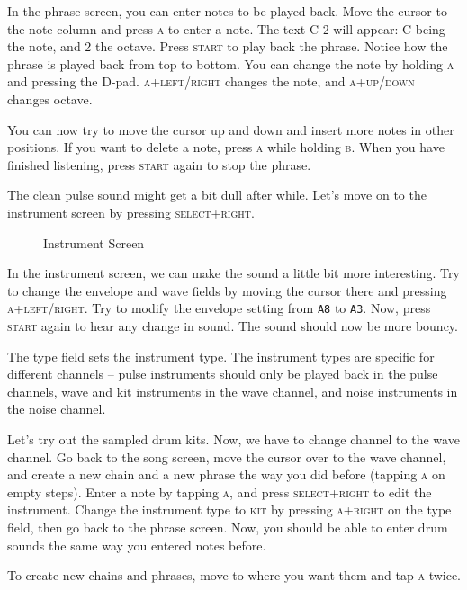 In the phrase screen, you can enter notes to be played back. Move the cursor to the note
column and press \textsc{a} to enter a note. The text C-2 will appear: C being the note, and 2 the
octave. Press \textsc{start} to play back the phrase. Notice how the phrase is played back from
top to bottom. You can change the note by holding \textsc{a} and pressing the
D-pad. \textsc{a+left/right} changes the note, and \textsc{a+up/down} changes octave.

You can now try to move the cursor up and down and insert more notes in other positions. If
you want to delete a note, press \textsc{a} while holding \textsc{b}. When you have finished listening, press
\textsc{start} again to stop the phrase.

The clean pulse sound might get a bit dull after while. Let's move on to the instrument
screen by pressing \textsc{select+right}.

\begin{figure}[hbtp]
\centering
{}
\caption{Instrument Screen}
\label{fig:instr}
\end{figure}

In the instrument screen, we can make the sound a little bit more interesting. Try to change
the envelope and wave fields by moving the cursor there and pressing \textsc{a+left/right}. Try
to modify the envelope setting from \texttt{A8} to \texttt{A3}. Now, press \textsc{start} again to hear any
change in sound. The sound should now be more bouncy.

The type field sets the instrument type. The instrument types are specific for different
channels -- pulse instruments should only be played back in the pulse channels, wave and kit
instruments in the wave channel, and noise instruments in the noise channel.

Let's try out the sampled drum kits. Now, we have to change channel to the wave channel.
Go back to the song screen, move the cursor over to the wave channel, and create a new
chain and a new phrase the way you did before (tapping \textsc{a} on empty steps).
Enter a note by tapping \textsc{a}, and press \textsc{select+right} to edit the instrument.
Change the instrument type to \textsc{kit} by pressing \textsc{a+right} on the type field,
then go back to the phrase screen. Now, you should be able to enter drum sounds the same way
you entered notes before.

To create new chains and phrases, move to where you want them and tap \textsc{a} twice.

